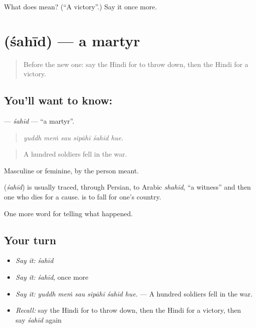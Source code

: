\begin{tcolorbox}[breakable,colback=teal!4,colframe=teal!35!black,title={Before you move on}]
What does  mean? (\textquotedblleft{}A victory\textquotedblright{}.) Say it once more.
\end{tcolorbox}
\section[\texorpdfstring{\hi{शहीद} (śahīd)}{शहीद (śahīd)}]{ (śahīd) — a martyr}

\label{lesson:HI-C323-sahid}



\begin{quote}
Before the new one: say the Hindi for to throw down, then the Hindi for a victory.
\end{quote}

\subsection*{You'll want to know: }
\textbf{} — \emph{śahīd} — \textquotedblleft{}a martyr\textquotedblright{}.

\begin{quote}
     
\end{quote}

\begin{quote}
\emph{yuddh meṁ sau sipāhī śahīd hue.}
\end{quote}

\begin{quote}
A hundred soldiers fell in the war.
\end{quote}

Masculine or feminine, by the person meant.

\begin{cousinweb}
\textbf{} (\emph{śahīd}) is usually traced, through Persian, to Arabic \emph{shahīd}, \textquotedblleft{}a witness\textquotedblright{} and then one who dies for a cause. \textbf{ } is to fall for one's country.
\end{cousinweb}

\begin{grammarlens}[title={What you've built}]
One more word for telling what happened.
\end{grammarlens}

\subsection*{Your turn}
\begin{itemize}
\raggedright
  \item \emph{Say it:} \emph{śahīd}
  \item \emph{Say it:} \emph{śahīd}, once more
  \item \emph{Say it:} \emph{yuddh meṁ sau sipāhī śahīd hue.} — A hundred soldiers fell in the war.
  \item \emph{Recall:} say the Hindi for to throw down, then the Hindi for a victory, then say \emph{śahīd} again
\end{itemize}

